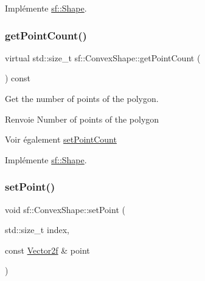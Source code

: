 Implémente \hyperlink{classsf_1_1Shape_a40e5d83713eb9f0c999944cf96458085}{sf\+::\+Shape}.

\mbox{\label{classsf_1_1ConvexShape_a0c54b8d48fe4e13414f6e667dbfc22a3}} 
\subsubsection{\texorpdfstring{get\+Point\+Count()}{getPointCount()}}
{\footnotesize\ttfamily virtual std\+::size\+\_\+t sf\+::\+Convex\+Shape\+::get\+Point\+Count (\begin{DoxyParamCaption}{ }\end{DoxyParamCaption}) const\hspace{0.3cm}{\ttfamily [virtual]}}



Get the number of points of the polygon. 

\begin{DoxyReturn}{Renvoie}
Number of points of the polygon
\end{DoxyReturn}
\begin{DoxySeeAlso}{Voir également}
\hyperlink{classsf_1_1ConvexShape_a56e6e79ade6dd651cc1a0e39cb68deae}{set\+Point\+Count} 
\end{DoxySeeAlso}


Implémente \hyperlink{classsf_1_1Shape_af988dd61a29803fc04d02198e44b5643}{sf\+::\+Shape}.

\mbox{\label{classsf_1_1ConvexShape_a5929e0ab0ba5ca1f102b40c234a8e92d}} 
\subsubsection{\texorpdfstring{set\+Point()}{setPoint()}}
{\footnotesize\ttfamily void sf\+::\+Convex\+Shape\+::set\+Point (\begin{DoxyParamCaption}\item[{std\+::size\+\_\+t}]{index,  }\item[{const \hyperlink{classsf_1_1Vector2}{Vector2f} \&}]{point }\end{DoxyParamCaption})}



